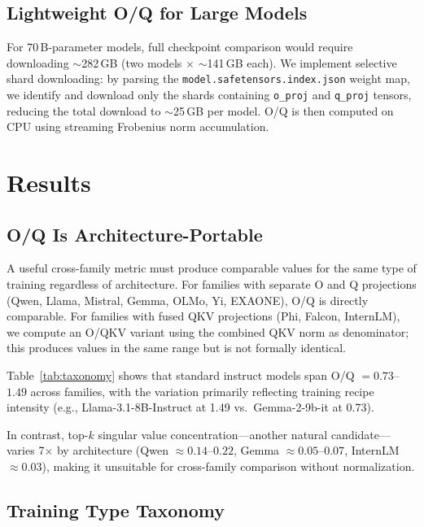 \documentclass[11pt]{article}
\begin{document}
\subsection{Lightweight O/Q for Large Models}

For 70\,B-parameter models, full checkpoint comparison would require downloading
$\sim$282\,GB (two models $\times$ $\sim$141\,GB each).
We implement selective shard downloading: by parsing the
\mbox{\texttt{model.safetensors.index.json}} weight map, we identify and download only
the shards containing \texttt{o\_proj} and \texttt{q\_proj} tensors, reducing
the total download to $\sim$25\,GB per model.
O/Q is then computed on CPU using streaming Frobenius norm accumulation.


\section{Results}

\subsection{O/Q Is Architecture-Portable}
\label{sec:invariance}

A useful cross-family metric must produce comparable values for the same type
of training regardless of architecture.
For families with separate O and Q projections (Qwen, Llama, Mistral, Gemma,
OLMo, Yi, EXAONE), O/Q is directly comparable.
For families with fused QKV projections (Phi, Falcon, InternLM), we compute
an O/QKV variant using the combined QKV norm as denominator; this produces
values in the same range but is not formally identical.

Table~\ref{tab:taxonomy} shows that standard instruct models span
O/Q $= 0.73$--$1.49$ across families, with the variation primarily reflecting
training recipe intensity (e.g., Llama-3.1-8B-Instruct at 1.49 vs.\
Gemma-2-9b-it at 0.73).

In contrast, top-$k$ singular value concentration---another natural
candidate---varies 7$\times$ by architecture
(Qwen $\approx 0.14$--$0.22$, Gemma $\approx 0.05$--$0.07$, InternLM $\approx 0.03$),
making it unsuitable for cross-family comparison without normalization.

\subsection{Training Type Taxonomy}
\label{sec:taxonomy}
\end{document}

